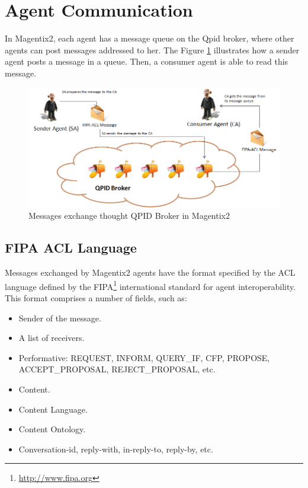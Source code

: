 \section{Agent Communication}



In Magentix2, each agent has a message queue on the Qpid broker, where other agents can post messages addressed to her.
The Figure \ref{fig:MessagesExchangeQpid} illustrates how a sender agent posts a message in a queue. Then, a consumer agent is able to read this message.
 \begin{figure}
 \centering
\includegraphics[width=\textwidth]{ProgrammingAgents/images/MessagesExchangeQpid.png}
\caption[Messages exchange thought QPID Broker in Magentix2]{Messages exchange thought QPID Broker in Magentix2 } \label{fig:MessagesExchangeQpid}
\end{figure}

\subsection{{FIPA} {ACL} Language}
Messages exchanged by Magentix2 agents have the format specified by the ACL language defined by the FIPA\footnote{\url{http://www.fipa.org}}  international standard for agent interoperability. This format comprises a number of fields, such as:
\begin{itemize}
	\item Sender of the message.
	\item A list of receivers.
	\item Performative: REQUEST, INFORM, QUERY\_IF, CFP, PROPOSE, ACCEPT\_PROPOSAL, REJECT\_PROPOSAL, etc.
	\item Content.
	\item Content Language.
	\item Content Ontology.
	\item Conversation-id, reply-with, in-reply-to, reply-by, etc.

\end{itemize}

